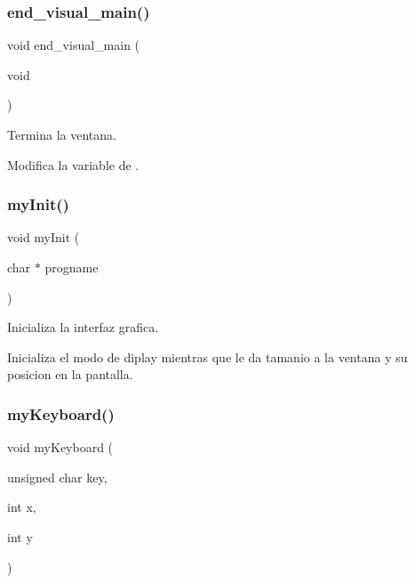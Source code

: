 \subsubsection{\texorpdfstring{end\+\_\+visual\+\_\+main()}{end\_visual\_main()}}
{\footnotesize\ttfamily void end\+\_\+visual\+\_\+main (\begin{DoxyParamCaption}\item[{void}]{ }\end{DoxyParamCaption})}



Termina la ventana. 

Modifica la variable de . \mbox{\label{interfaz-grafica_8c_a2db9d4ba828a33f3d95cb840b12aa58d}} 
\subsubsection{\texorpdfstring{my\+Init()}{myInit()}}
{\footnotesize\ttfamily void my\+Init (\begin{DoxyParamCaption}\item[{char $\ast$}]{progname }\end{DoxyParamCaption})}



Inicializa la interfaz grafica. 

Inicializa el modo de diplay mientras que le da tamanio a la ventana y su posicion en la pantalla. \mbox{\label{interfaz-grafica_8c_a723d4409337490d7963ce39bc9a6ec61}} 
\subsubsection{\texorpdfstring{my\+Keyboard()}{myKeyboard()}}
{\footnotesize\ttfamily void my\+Keyboard (\begin{DoxyParamCaption}\item[{unsigned char}]{key,  }\item[{int}]{x,  }\item[{int}]{y }\end{DoxyParamCaption})}



